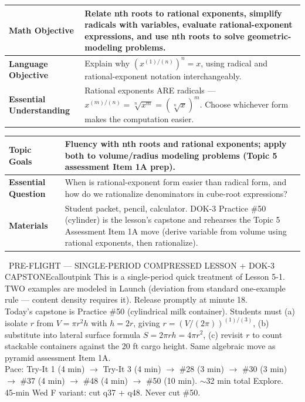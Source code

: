 \documentclass[11pt]{article}
\newcommand{\lessonrow}[2]{\textbf{#1} & #2 \\ \hline}
\begin{document}

{\small
\renewcommand{\arraystretch}{1.25}
\noindent\begin{tabular}{|p{1.8in}|p{4.8in}|}
\hline
\lessonrow{Math Objective}{Relate nth roots to rational exponents, simplify radicals with variables, evaluate rational-exponent expressions, and use nth roots to solve geometric-modeling problems.}
\lessonrow{Language Objective}{Explain why \((x^{(1)/(n)})^n = x\), using radical and rational-exponent notation interchangeably.}
\lessonrow{Essential Understanding}{Rational exponents ARE radicals --- \(x^{(m)/(n)} = \sqrt[n]{x^m} = (\sqrt[n]{x})^m\). Choose whichever form makes the computation easier.}
\end{tabular}
}

{\small
\renewcommand{\arraystretch}{1.25}
\noindent\begin{tabular}{|p{1.8in}|p{4.8in}|}
\hline
\lessonrow{Topic Goals}{Fluency with nth roots and rational exponents; apply both to volume/radius modeling problems (Topic 5 assessment Item 1A prep).}
\lessonrow{Essential Question}{When is rational-exponent form easier than radical form, and how do we rationalize denominators in cube-root expressions?}
\lessonrow{Materials}{Student packet, pencil, calculator. DOK-3 Practice \#50 (cylinder) is the lesson's capstone and rehearses the Topic 5 Assessment Item 1A move (derive variable from volume using rational exponents, then rationalize).}
\end{tabular}
}

\begin{callout}{\IconPin\ PRE-FLIGHT --- SINGLE-PERIOD COMPRESSED LESSON + DOK-3 CAPSTONE}{calloutpink}
This is a single-period quick treatment of Lesson 5-1. TWO examples are modeled in Launch (deviation from standard one-example rule --- content density requires it). Release promptly at minute 18.\\
Today's capstone is Practice \#50 (cylindrical milk container). Students must (a) isolate \(r\) from \(V = \pi r^2 h\) with \(h = 2r\), giving \(r = (V/(2\pi))^{(1)/(3)}\), (b) substitute into lateral surface formula \(S = 2\pi rh = 4\pi r^2\), (c) revisit \(r\) to count stackable containers against the 20 ft cargo height. Same algebraic move as pyramid assessment Item 1A.\\
Pace: Try-It 1 (4 min) \(\rightarrow\) Try-It 3 (4 min) \(\rightarrow\) \#28 (3 min) \(\rightarrow\) \#30 (3 min) \(\rightarrow\) \#37 (4 min) \(\rightarrow\) \#48 (4 min) \(\rightarrow\) \#50 (10 min). \(\sim\)32 min total Explore.\\
45-min Wed F variant: cut q37 + q48. Never cut \#50.
\end{callout}
\end{document}
